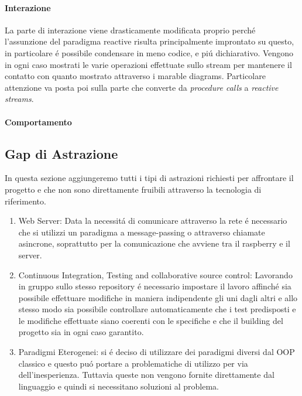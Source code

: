 \paragraph{Interazione} La parte di interazione viene drasticamente modificata proprio perch\'e l'assunzione del paradigma reactive risulta principalmente improntato su questo, in particolare \'e possibile condensare in meno codice, e pi\'u dichiarativo. Vengono in ogni caso mostrati le varie operazioni effettuate sullo stream per mantenere il contatto con quanto mostrato attraverso i marable diagrams. Particolare attenzione va posta poi sulla parte che converte da \textit{procedure calls} a \textit{reactive streams}.

\paragraph{Comportamento}

\subsection{Gap di Astrazione}

In questa sezione aggiungeremo tutti i tipi di astrazioni richiesti per affrontare il progetto e che non sono direttamente fruibili attraverso la tecnologia di riferimento.

\begin{enumerate}
  \item Web Server: Data la necessit\'a di comunicare attraverso la rete \'e necessario che si utilizzi un paradigma a message-passing o attraverso chiamate asincrone, soprattutto per la comunicazione che avviene tra il raspberry e il server.
  \item Continuous Integration, Testing and collaborative source control: Lavorando in gruppo sullo stesso repository \'e necessario impostare il lavoro affinch\'e sia possibile effettuare modifiche in maniera indipendente gli uni dagli altri e allo stesso modo sia possibile controllare automaticamente che i test predisposti e le modifiche effettuate siano coerenti con le specifiche e che il building del progetto sia in ogni caso garantito.
  \item{Paradigmi Eterogenei}: si \'e deciso di utilizzare dei paradigmi diversi dal OOP classico e questo pu\'o portare a problematiche di utilizzo per via dell'inesperienza. Tuttavia queste non vengono fornite direttamente dal linguaggio e quindi si necessitano soluzioni al problema.
\end{enumerate}

